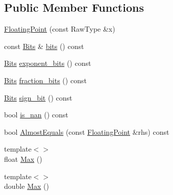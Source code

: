 \subsection*{Public Member Functions}
\begin{DoxyCompactItemize}
\item 
\hyperlink{classtesting_1_1internal_1_1FloatingPoint_a0dabf840863e0df84046f171c891fe71}{Floating\+Point} (const Raw\+Type \&x)
\item 
const \hyperlink{classtesting_1_1internal_1_1FloatingPoint_abf228bf6cd48f12c8b44c85b4971a731}{Bits} \& \hyperlink{classtesting_1_1internal_1_1FloatingPoint_aab053be914bdc9e507c0db89740c318c}{bits} () const
\item 
\hyperlink{classtesting_1_1internal_1_1FloatingPoint_abf228bf6cd48f12c8b44c85b4971a731}{Bits} \hyperlink{classtesting_1_1internal_1_1FloatingPoint_af6bf8fab8df572ecb137a3516ff390ae}{exponent\+\_\+bits} () const
\item 
\hyperlink{classtesting_1_1internal_1_1FloatingPoint_abf228bf6cd48f12c8b44c85b4971a731}{Bits} \hyperlink{classtesting_1_1internal_1_1FloatingPoint_aa17337e50a2ac855719bc0676529558f}{fraction\+\_\+bits} () const
\item 
\hyperlink{classtesting_1_1internal_1_1FloatingPoint_abf228bf6cd48f12c8b44c85b4971a731}{Bits} \hyperlink{classtesting_1_1internal_1_1FloatingPoint_afb8a816bb598225d775caaf43a893ef0}{sign\+\_\+bit} () const
\item 
bool \hyperlink{classtesting_1_1internal_1_1FloatingPoint_a1fc654fd206efa98e480aa1e034f30d5}{is\+\_\+nan} () const
\item 
bool \hyperlink{classtesting_1_1internal_1_1FloatingPoint_a965214c1af2f9ac5adb1393794aa81e5}{Almost\+Equals} (const \hyperlink{classtesting_1_1internal_1_1FloatingPoint}{Floating\+Point} \&rhs) const
\item 
{\footnotesize template$<$$>$ }\\float \hyperlink{classtesting_1_1internal_1_1FloatingPoint_af2eda9331e679229a1baa3404b57b51d}{Max} ()
\item 
{\footnotesize template$<$$>$ }\\double \hyperlink{classtesting_1_1internal_1_1FloatingPoint_afc2e85c0e886cb13b2300e961c9a9648}{Max} ()
\end{DoxyCompactItemize}
